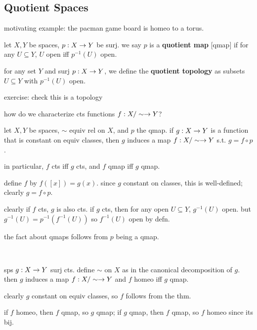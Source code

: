\subsection{Quotient Spaces}

motivating example: the pacman game board is homeo to a torus.

\begin{defn}
    let $X,Y$ be spaces, $p:X\rightarrow Y$ be surj.
    we say $p$ is a \textbf{quotient map} [qmap] if for any $U\subseteq Y$,
    $U$ open iff $p^{-1}(U)$ open.

    for any set $Y$ and surj $p:X\rightarrow Y$, we define the
    \textbf{quotient topology} as subsets $U\subseteq Y$ with $p^{-1}(U)$ open.
\end{defn}
exercise: check this is a topology

how do we characterize cts functions $f:X/\sim\rightarrow Y$?

\begin{prop}
    let $X,Y$ be spaces, $\sim$ equiv rel on $X$, and $p$ the qmap.
    if $g:X\rightarrow Y$ is a function that is constant on equiv classes, then $g$
    induces a map $f:X/\sim\rightarrow Y$ s.t. $g=f\circ p$.

    in particular, $f$ cts iff $g$ cts, and $f$ qmap iff $g$ qmap.
\end{prop}

\begin{pf}[source=Primary Source Material]
    define $f$ by $f([x])=g(x)$.
    since $g$ constant on classes, this is well-defined; clearly $g=f\circ p$.

    clearly if $f$ cts, $g$ is also cts.
    if $g$ cts, then for any open $U\subseteq Y$, $g^{-1}(U)$ open.
    but $g^{-1}(U)=p^{-1}(f^{-1}(U))$ so $f^{-1}(U)$ open by defn.

    the fact about qmaps follows from $p$ being a qmap.
\end{pf} \

\begin{crll}
    sps $g:X\rightarrow Y$ surj cts.
    define $\sim$ on $X$ as in the canonical decomposition of $g$.
    then $g$ induces a map $f:X/\sim\rightarrow Y$ and $f$ homeo iff $g$ qmap.
\end{crll}

\begin{pf}[source=Primary Source Material]
    clearly $g$ constant on equiv classes, so $f$ follows from the thm.

    if $f$ homeo, then $f$ qmap, so $g$ qmap;
    if $g$ qmap, then $f$ qmap, so $f$ homeo since its bij.
\end{pf}




